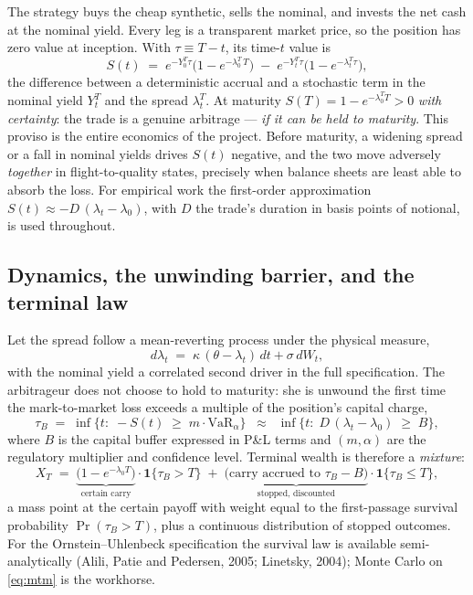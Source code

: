\documentclass[11pt]{article}
\newcommand{\VaR}{\mathrm{VaR}}
\begin{document}
The strategy buys the cheap synthetic, sells the nominal, and invests the net cash at the nominal yield. Every leg is a transparent market price, so the position has zero value at inception. With $\tau\equiv T-t$, its time-$t$ value is
\begin{equation}
S(t)\;=\;e^{-Y_0^T\tau}\Big(1-e^{-\lambda_0^T\,T}\Big)\;-\;e^{-Y_t^T\tau}\Big(1-e^{-\lambda_t^T\tau}\Big),
\label{eq:mtm}
\end{equation}
the difference between a deterministic accrual and a stochastic term in the nominal yield $Y_t^T$ and the spread $\lambda_t^T$. At maturity $S(T)=1-e^{-\lambda_0^T T}>0$ \emph{with certainty}: the trade is a genuine arbitrage --- \emph{if it can be held to maturity}. This proviso is the entire economics of the project. Before maturity, a widening spread or a fall in nominal yields drives $S(t)$ negative, and the two move adversely \emph{together} in flight-to-quality states, precisely when balance sheets are least able to absorb the loss. For empirical work the first-order approximation
$S(t)\approx -D\,(\lambda_t-\lambda_0)$, with $D$ the trade's duration in basis points of notional, is used throughout.

\subsection{Dynamics, the unwinding barrier, and the terminal law}

Let the spread follow a mean-reverting process under the physical measure,
\begin{equation}
d\lambda_t \;=\; \kappa\,(\theta-\lambda_t)\,dt+\sigma\,dW_t ,
\label{eq:ou}
\end{equation}
with the nominal yield a correlated second driver in the full specification. The arbitrageur does not choose to hold to maturity: she is unwound the first time the mark-to-market loss exceeds a multiple of the position's capital charge,
\begin{equation}
\tau_B \;=\; \inf\Big\{t:\; -S(t)\;\ge\; m\cdot\VaR_\alpha\Big\}
\;\;\approx\;\; \inf\Big\{t:\; D\,(\lambda_t-\lambda_0)\;\ge\;B\Big\},
\label{eq:barrier}
\end{equation}
where $B$ is the capital buffer expressed in P\&L terms and $(m,\alpha)$ are the regulatory multiplier and confidence level. Terminal wealth is therefore a \emph{mixture}:
\begin{equation}
X_T \;=\;
\underbrace{\Big(1-e^{-\lambda_0 T}\Big)}_{\text{certain carry}}\cdot\mathbf{1}\{\tau_B>T\}
\;+\;\underbrace{\Big(\text{carry accrued to }\tau_B-B\Big)}_{\text{stopped, discounted}}\cdot\mathbf{1}\{\tau_B\le T\},
\label{eq:mixture}
\end{equation}
a mass point at the certain payoff with weight equal to the first-passage survival probability $\Pr(\tau_B>T)$, plus a continuous distribution of stopped outcomes. For the Ornstein--Uhlenbeck specification the survival law is available semi-analytically (Alili, Patie and Pedersen, 2005; Linetsky, 2004); Monte Carlo on \eqref{eq:mtm} is the workhorse.
\end{document}
